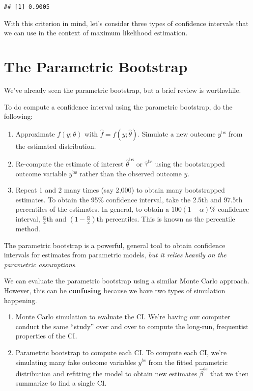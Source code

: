 \documentclass[
]{book}
\providecommand{\tightlist}{%
  \setlength{\itemsep}{0pt}\setlength{\parskip}{0pt}}
\begin{document}
\begin{verbatim}
## [1] 0.9005
\end{verbatim}

With this criterion in mind, let's consider three types of confidence
intervals that we can use in the context of maximum likelihood
estimation.

\hypertarget{the-parametric-bootstrap-1}{%
\section{The Parametric Bootstrap}\label{the-parametric-bootstrap-1}}

We've already seen the parametric bootstrap, but a brief review is
worthwhile.

To do compute a confidence interval using the parametric bootstrap, do
the following:

\begin{enumerate}
\def\labelenumi{\arabic{enumi}.}
\tightlist
\item
  Approximate \(f(y; \theta)\) with \(\hat{f} = f(y; \hat{\theta})\).
  Simulate a new outcome \(y^{\text{bs}}\) from the estimated
  distribution.
\item
  Re-compute the estimate of interest \(\hat{\theta}^{\text{bs}}\) or
  \(\hat{\tau}^{\text{bs}}\) using the bootstrapped outcome variable
  \(y^{\text{bs}}\) rather than the observed outcome \(y\).
\item
  Repeat 1 and 2 many times (say 2,000) to obtain many bootstrapped
  estimates. To obtain the 95\% confidence interval, take the 2.5th and
  97.5th percentiles of the estimates. In general, to obtain a
  \(100(1 - \alpha)\%\) confidence interval, \(\frac{\alpha}{2}\)th and
  \((1 - \frac{\alpha}{2})\)th percentiles. This is known as the
  percentile method.
\end{enumerate}

The parametric bootstrap is a powerful, general tool to obtain
confidence intervals for estimates from parametric models, \emph{but it
relies heavily on the parametric assumptions}.

We can evaluate the parametric bootstrap using a similar Monte Carlo
approach. However, this can be \textbf{confusing} because we have two
types of simulation happening.

\begin{enumerate}
\def\labelenumi{\arabic{enumi}.}
\tightlist
\item
  Monte Carlo simulation to evaluate the CI. We're having our computer
  conduct the same ``study'' over and over to compute the long-run,
  frequentist properties of the CI.
\item
  Parametric bootstrap to compute each CI. To compute each CI, we're
  simulating many fake outcome variables \(y^{bs}\) from the fitted
  parametric distribution and refitting the model to obtain new
  estimates \(\hat{\beta}^{bs}\) that we then summarize to find a single
  CI.
\end{enumerate}
\end{document}

